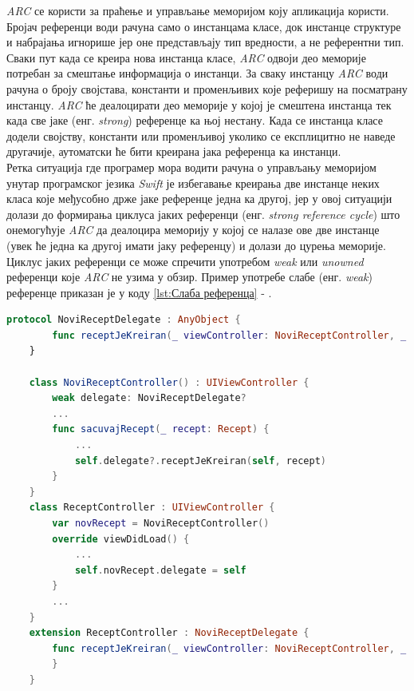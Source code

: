 \documentclass[12pt,oneside]{memoir}
\begin{document}
\indent \textit{ARC} се користи за праћење и управљање меморијом коју апликација користи. Бројач референци води рачуна само о инстанцама класе, док инстанце структуре и набрајања игнорише јер оне представљају тип вредности, а не референтни тип. Сваки пут када се креира нова инстанца класе, \textit{ARC} одвоји део меморије потребан за смештање информација о инстанци. За сваку инстанцу \textit{ARC} води рачуна о броју својстава, константи и променљивих које реферишу на посматрану инстанцу. \textit{ARC} ће деалоцирати део меморије у којој је смештена инстанца тек када све јаке (енг. \textit{strong}) референце ка њој нестану. Када се инстанца класе додели својству, константи или променљивој уколико се експлицитно не наведе другачије, аутоматски ће бити креирана јака референца ка инстанци. \\
\indent Ретка ситуација где програмер мора водити рачуна о управљању меморијом унутар програмског језика \textit{Swift} је избегавање креирања две инстанце неких класа које међусобно држе јаке референце једна ка другој, јер у овој ситуацији долази до формирања циклуса јаких референци (енг. \textit{strong reference cycle}) што онемогућује \textit{ARC} да деалоцира меморију у којој се налазе ове две инстанце (увек ће једна ка другој имати јаку референцу) и долази до цурења меморије. Циклус јаких референци се може спречити употребом \textit{weak} или \textit{unowned} референци које \textit{ARC} не узима у обзир. Пример употребе слабе (енг. \textit{weak}) референце приказан је у коду \ref{lst:Слаба референца} - .

\begin{lstlisting}[caption=\textit{{Слаба референца}}, label={lst:Слаба референца}, language=Swift, frame=single]
    protocol NoviReceptDelegate : AnyObject {
        func receptJeKreiran(_ viewController: NoviReceptController, _ recept: Recept)
    }
    
    class NoviReceptController() : UIViewController {
        weak delegate: NoviReceptDelegate?
        ...
        func sacuvajRecept(_ recept: Recept) {
            ...
            self.delegate?.receptJeKreiran(self, recept)
        }
    }
    class ReceptController : UIViewController {
        var novRecept = NoviReceptController()
        override viewDidLoad() {
            ...
            self.novRecept.delegate = self
        }
        ...
    }
    extension ReceptController : NoviReceptDelegate {
        func receptJeKreiran(_ viewController: NoviReceptController, _ recept: Recept) {
        }
    }
\end{lstlisting}
\end{document}
